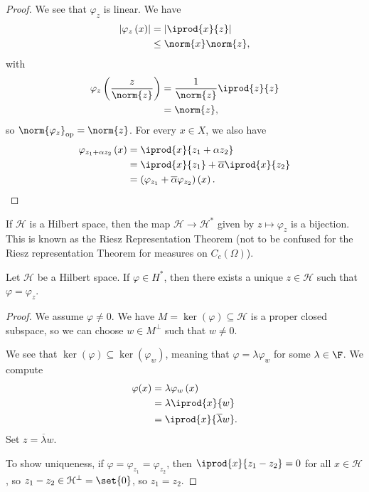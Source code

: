 \documentclass[10pt]{mypackage}
\begin{document}
\begin{proof}
  We see that $\varphi_z$ is linear. We have
  \begin{align*}
    \left\vert \varphi_z\left(x\right) \right\vert &= \left\vert \iprod{x}{z} \right\vert\\
                                                   &\leq \norm{x}\norm{z},
  \end{align*}
  with
  \begin{align*}
    \varphi_z\left(\frac{z}{\norm{z}}\right) &= \frac{1}{\norm{z}} \iprod{z}{z}\\
                                             &= \norm{z},
  \end{align*}
  so $\norm{\varphi_z}_{\text{op}} = \norm{z}$. For every $x\in X$, we also have
  \begin{align*}
    \varphi_{z_1 + \alpha z_2} \left(x\right) &= \iprod{x}{z_1 + \alpha z_2}\\
                                              &= \iprod{x}{z_1} + \overline{\alpha} \iprod{x}{z_2}\\
                                              &= \left(\varphi_{z_1} + \overline{\alpha}\varphi_{z_2}\right) \left(x\right).
  \end{align*}
\end{proof}
If $\mathcal{H}$ is a Hilbert space, then the map $\mathcal{H}\rightarrow \mathcal{H}^{\ast}$ given by $z\mapsto \varphi_z$ is a bijection. This is known as the Riesz Representation Theorem (not to be confused for the Riesz representation Theorem for measures on $C_c\left(\Omega\right)$).
\begin{theorem}
  Let $\mathcal{H}$ be a Hilbert space. If $\varphi\in H^{\ast}$, then there exists a unique $z\in \mathcal{H}$ such that $\varphi = \varphi_z$.
\end{theorem}
\begin{proof}
  We assume $\varphi\neq 0$. We have $M = \ker\left(\varphi\right)\subseteq \mathcal{H}$ is a proper closed subspace, so we can choose $w\in M^{\perp}$ such that $w\neq 0$.\newline

  We see that $\ker\left(\varphi\right)\subseteq \ker\left(\varphi_w\right)$, meaning that $\varphi = \lambda \varphi_w$ for some $\lambda\in \F$. We compute
  \begin{align*}
    \varphi(x) &= \lambda\varphi_w\left(x\right)\\
               &= \lambda \iprod{x}{w}\\
               &= \iprod{x}{\overline{\lambda}w}.
  \end{align*}
  Set $z = \overline{\lambda}w$.\newline

  To show uniqueness, if $\varphi = \varphi_{z_1} = \varphi_{z_2}$, then $ \iprod{x}{z_1 - z_2} = 0 $ for all $x\in \mathcal{H}$, so $z_1 - z_2 \in \mathcal{H}^{\perp} = \set{0}$, so $z_1 = z_2$.
\end{proof}
\end{document}
